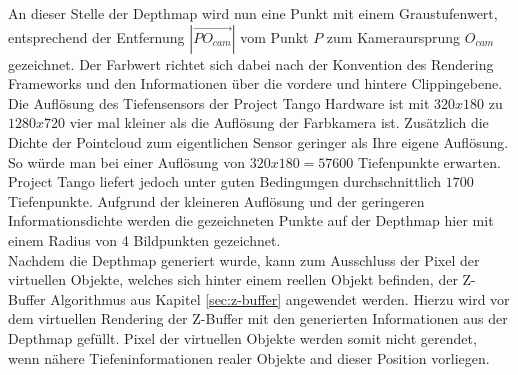 An dieser Stelle der Depthmap wird nun eine Punkt mit einem Graustufenwert, entsprechend der Entfernung \(|\overrightarrow{PO_{cam}}|\) vom Punkt \(P\) zum Kameraursprung \(O_{cam}\) gezeichnet. Der Farbwert richtet sich dabei nach der Konvention des Rendering Frameworks und den Informationen über die vordere und hintere Clippingebene.\\

Die Auflösung des Tiefensensors der Project Tango Hardware ist mit \(320x180\) zu \(1280x720\) vier mal kleiner als die Auflösung der Farbkamera ist. Zusätzlich die Dichte der Pointcloud zum eigentlichen Sensor geringer als Ihre eigene Auflösung. So würde man bei einer Auflösung von \(320x180 = 57600\) Tiefenpunkte erwarten. Project Tango liefert jedoch unter guten Bedingungen durchschnittlich \(1700\) Tiefenpunkte. Aufgrund der kleineren Auflösung und der geringeren Informationsdichte werden die gezeichneten Punkte auf der Depthmap hier mit einem Radius von 4 Bildpunkten gezeichnet. \\

Nachdem die Depthmap generiert wurde, kann zum Ausschluss der Pixel der virtuellen Objekte, welches sich hinter einem reellen Objekt befinden, der Z-Buffer Algorithmus aus Kapitel \ref{sec:z-buffer} angewendet werden. Hierzu wird vor dem virtuellen Rendering der Z-Buffer mit den generierten Informationen aus der Depthmap gefüllt. Pixel der virtuellen Objekte werden somit nicht gerendet, wenn nähere Tiefeninformationen realer Objekte and dieser Position vorliegen. 


